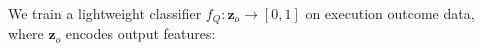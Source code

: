 \documentclass{article}
\theoremstyle{plain}
\theoremstyle{definition}
\theoremstyle{remark}
\begin{document}
We train a lightweight classifier $f_Q: \mathbf{z}_o \rightarrow [0,1]$ on execution outcome data, where $\mathbf{z}_o$ encodes output features:
%



%
%
\end{document}
